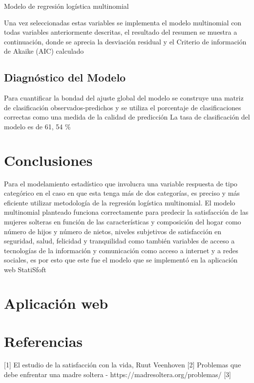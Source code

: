 \documentclass[11pt,twoside]{article}
\begin{document}
\noindent
Modelo de regresión logística multinomial 

\noindent
Una vez seleccionadas estas variables se implementa el modelo multinomial con todas variables anteriormente descritas, el resultado del resumen se muestra a continuación, donde se aprecia la desviación residual y el Criterio de información de Akaike (AIC) calculado






\subsection{Diagnóstico del Modelo}

Para cuantificar la bondad del ajuste global del modelo se construye una matriz de clasificación observados-predichos y se utiliza el porcentaje de clasificaciones correctas como una medida de la calidad de predicción
La tasa de clasificación del modelo es de 61, 54 \%







\section{Conclusiones}


Para el modelamiento estadístico que involucra una variable respuesta de tipo categórico en el caso en que esta tenga más de dos categorías, es preciso y más eficiente utilizar metodología de la regresión logística multinomial.
El modelo multinomial planteado funciona correctamente para predecir la satisfacción de las mujeres solteras en función de las características y composición del hogar como número de hijos y número de nietos, niveles subjetivos de satisfacción en seguridad, salud, felicidad y tranquilidad como también variables de acceso a tecnologías de la información y comunicación como acceso a internet y a redes sociales, es por esto que este fue el modelo que se implementó en la aplicación web StatiSfoft   





\section{Aplicación web}






\section{Referencias}
[1] El estudio de la satisfacción con la vida, Ruut Veenhoven 
[2] Problemas que debe enfrentar una madre soltera - https://madresoltera.org/problemas/
[3] 
\end{document}
